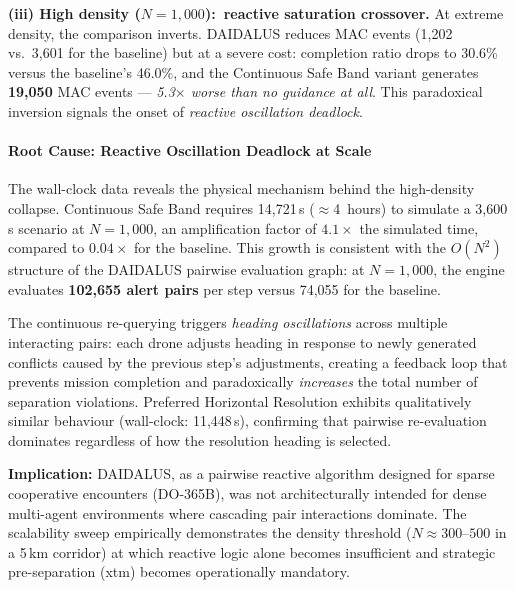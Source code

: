 \textbf{(iii) High density ($N = 1{,}000$):\ reactive saturation crossover.}
At extreme density, the comparison inverts. DAIDALUS reduces MAC events (1,202 vs.\ 3,601
for the baseline) but at a severe cost: completion ratio drops to 30.6\% versus the
baseline's 46.0\%, and the Continuous Safe Band variant generates \textbf{19,050} MAC
events --- \emph{5.3$\times$ worse than no guidance at all}. This paradoxical inversion
signals the onset of \emph{reactive oscillation deadlock}.

\paragraph{Root Cause: Reactive Oscillation Deadlock at Scale}
\label{sec:daidalus_saturation}

The wall-clock data reveals the physical mechanism behind the high-density collapse.
Continuous Safe Band requires 14,721\,s ($\approx$4~hours) to simulate a 3,600\,s scenario
at $N = 1{,}000$, an amplification factor of $4.1\times$ the simulated time, compared to
$0.04\times$ for the baseline. This growth is consistent with the $O(N^2)$ structure of
the DAIDALUS pairwise evaluation graph: at $N = 1{,}000$, the engine evaluates
\textbf{102,655 alert pairs} per step versus 74,055 for the baseline.

The continuous re-querying triggers \emph{heading oscillations} across multiple interacting
pairs: each drone adjusts heading in response to newly generated conflicts caused by the
previous step's adjustments, creating a feedback loop that prevents mission completion and
paradoxically \emph{increases} the total number of separation violations. Preferred
Horizontal Resolution exhibits qualitatively similar behaviour (wall-clock: 11,448\,s),
confirming that pairwise re-evaluation dominates regardless of how the resolution heading
is selected.

\textbf{Implication:} DAIDALUS, as a pairwise reactive algorithm designed for sparse
cooperative encounters (DO-365B), was not architecturally intended for dense multi-agent
environments where cascading pair interactions dominate. The scalability sweep empirically
demonstrates the density threshold ($N \approx 300$--$500$ in a 5\,km corridor) at which
reactive logic alone becomes insufficient and strategic pre-separation (\gls{xtm}) becomes
operationally mandatory.


